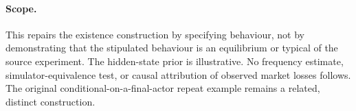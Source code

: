 \documentclass[11pt,a4paper]{article}
\begin{document}
\paragraph{Scope.}
This repairs the existence construction by specifying behaviour, not by
demonstrating that the stipulated behaviour is an equilibrium or typical
of the source experiment. The hidden-state prior is illustrative. No
frequency estimate, simulator-equivalence test, or causal attribution of
observed market losses follows. The original conditional-on-a-final-actor
repeat example remains a related, distinct construction.
\end{document}
